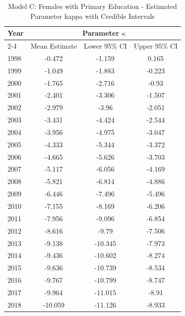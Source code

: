 \begin{landscape}
\begin{table}[htbp]
\centering
\caption{Model C: Females with Primary Education - Estimated Parameter kappa  with Credible Intervals}
\label{tab:parameters_k18}
\begin{tabular}{@{}lccc@{}}
\toprule
Year & \multicolumn{3}{c}{Parameter \(\kappa\)} \\
\cmidrule(lr){2-4}
      & Mean Estimate & Lower 95\% CI & Upper 95\% CI \\
\midrule
1998 & -0.472 & -1.159 & 0.165 \\
1999 & -1.049 & -1.883 & -0.223 \\
2000 & -1.765 & -2.716 & -0.93 \\
2001 & -2.401 & -3.306 & -1.507 \\
2002 & -2.979 & -3.96 & -2.051 \\
2003 & -3.431 & -4.424 & -2.544 \\
2004 & -3.956 & -4.975 & -3.047 \\
2005 & -4.333 & -5.344 & -3.372 \\
2006 & -4.665 & -5.626 & -3.703 \\
2007 & -5.117 & -6.056 & -4.169 \\
2008 & -5.821 & -6.814 & -4.886 \\
2009 & -6.446 & -7.496 & -5.496 \\
2010 & -7.155 & -8.169 & -6.206 \\
2011 & -7.956 & -9.096 & -6.854 \\
2012 & -8.616 & -9.79 & -7.506 \\
2013 & -9.138 & -10.345 & -7.973 \\
2014 & -9.436 & -10.602 & -8.274 \\
2015 & -9.636 & -10.739 & -8.534 \\
2016 & -9.767 & -10.799 & -8.747 \\
2017 & -9.964 & -11.015 & -8.91 \\
2018 & -10.059 & -11.126 & -8.933 \\
\bottomrule
\end{tabular}
\end{table}
\end{landscape}